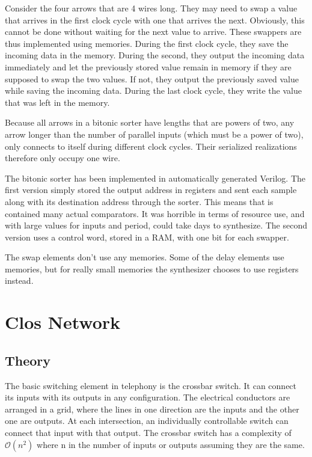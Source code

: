 \documentclass[
	utf8,
	largesmallcaps,
	intlimits,
	widermath,
	sharecounter,
	nobreak,
	definition=marks,
	numbers,
	noparts
]{rtthesis}
\begin{document}
Consider the four arrows that are 4 wires long. They may need to swap a value
that arrives in the first clock cycle with one that arrives the next.
Obviously, this cannot be done without waiting for the next value to arrive.
These swappers are thus implemented using memories. During the first clock
cycle, they save the incoming data in the memory. During the second, they
output the incoming data immediately and let the previously stored value remain
in memory if they are supposed to swap the two values. If not, they output the
previously saved value while saving the incoming data. During the last clock
cycle, they write the value that was left in the memory.

Because all arrows in a bitonic sorter have lengths that are powers of two, any
arrow longer than the number of parallel inputs (which must be a power of two),
only connects to itself during different clock cycles. Their serialized
realizations therefore only occupy one wire.

The bitonic sorter has been implemented in automatically generated Verilog. The
first version simply stored the output address in registers and sent each
sample along with its destination address through the sorter. This means that
is contained many actual comparators. It was horrible in terms of resource use,
and with large values for inputs and period, could take days to synthesize. The
second version uses a control word, stored in a RAM, with one bit for each
swapper.

The swap elements don't use any memories. Some of the delay elements use
memories, but for really small memories the synthesizer chooses to use
registers instead.


\chapter{Clos Network}

\section{Theory}

The basic switching element in telephony is the crossbar switch. It can connect
its inputs with its outputs in any configuration. The electrical conductors are
arranged in a grid, where the lines in one direction are the inputs and the
other one are outputs. At each intersection, an individually controllable
switch can connect that input with that output. The crossbar switch has a
complexity of $\mathcal{O}(n^2)$ where n in the number of inputs or outputs
assuming they are the same.
\end{document}
